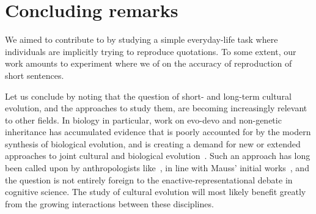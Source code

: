 \section{Concluding remarks}\label{sec:conclusion}

We aimed to contribute to  by studying a simple everyday-life task where individuals are implicitly trying to reproduce quotations.
To some extent, our work amounts to  experiment where we  of  on the accuracy of reproduction of short sentences.

\begin{new}

Let us conclude by noting that the question of short- and long-term cultural evolution, and the approaches to study them, are becoming increasingly relevant to other fields.
In biology in particular, work on evo-devo and non-genetic inheritance has accumulated evidence that is poorly accounted for by the modern synthesis of biological evolution, and is creating a demand for new or extended  approaches to joint cultural and biological evolution~\citep[see][for instance]{gilbert_eco-evo-devo:_2015}.
Such an approach has long been called upon by anthropologists like~\citet{ingold_beyond_2004,ingold_complementarity_1998}, in line with Mauss' initial works~\citep{mauss_les_1936}, and the question is not entirely foreign to the enactive-representational debate in cognitive science.
The study of cultural evolution will most likely benefit greatly from the growing interactions between these disciplines.

\end{new}